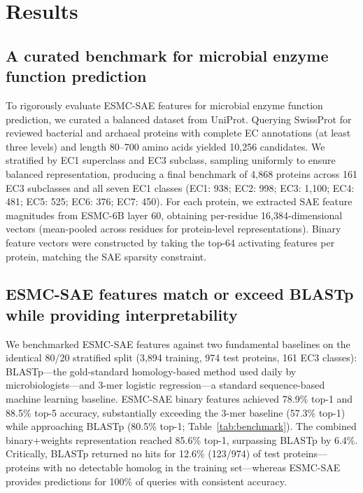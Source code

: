 \documentclass[12pt,a4paper]{article}
\begin{document}
\section{Results}

\subsection{A curated benchmark for microbial enzyme function prediction}

To rigorously evaluate ESMC-SAE features for microbial enzyme function prediction, we curated a balanced dataset from UniProt. Querying SwissProt for reviewed bacterial and archaeal proteins with complete EC annotations (at least three levels) and length 80--700 amino acids yielded 10,256 candidates. We stratified by EC1 superclass and EC3 subclass, sampling uniformly to ensure balanced representation, producing a final benchmark of 4,868 proteins across 161 EC3 subclasses and all seven EC1 classes (EC1: 938; EC2: 998; EC3: 1,100; EC4: 481; EC5: 525; EC6: 376; EC7: 450). For each protein, we extracted SAE feature magnitudes from ESMC-6B layer 60, obtaining per-residue 16,384-dimensional vectors (mean-pooled across residues for protein-level representations). Binary feature vectors were constructed by taking the top-64 activating features per protein, matching the SAE sparsity constraint.

\subsection{ESMC-SAE features match or exceed BLASTp while providing interpretability}

We benchmarked ESMC-SAE features against two fundamental baselines on the identical 80/20 stratified split (3,894 training, 974 test proteins, 161 EC3 classes): BLASTp---the gold-standard homology-based method used daily by microbiologists---and 3-mer logistic regression---a standard sequence-based machine learning baseline. ESMC-SAE binary features achieved 78.9\% top-1 and 88.5\% top-5 accuracy, substantially exceeding the 3-mer baseline (57.3\% top-1) while approaching BLASTp (80.5\% top-1; Table~\ref{tab:benchmark}). The combined binary+weights representation reached 85.6\% top-1, surpassing BLASTp by 6.4\%. Critically, BLASTp returned no hits for 12.6\% (123/974) of test proteins---proteins with no detectable homolog in the training set---whereas ESMC-SAE provides predictions for 100\% of queries with consistent accuracy.
\end{document}
